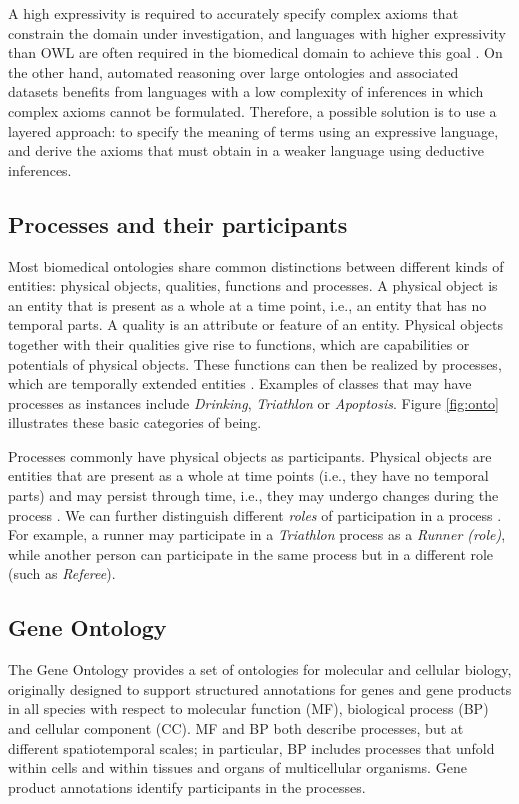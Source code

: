\documentclass[11pt]{article}
\renewcommand{\cite}{\citep}
\begin{document}
A high expressivity is required to accurately specify complex axioms
that constrain the domain under investigation, and languages with
higher expressivity than OWL are often required in the biomedical
domain to achieve this goal \cite{Hoehndorf2009sequences, rnao}. On
the other hand, automated reasoning over large ontologies and
associated datasets benefits from languages with a low complexity of
inferences in which complex axioms cannot be formulated. Therefore, a
possible solution is to use a layered approach: to specify the meaning
of terms using an expressive language, and derive the axioms that
must obtain in a weaker language using deductive inferences.

\subsection{Processes and their participants}
Most biomedical ontologies share common distinctions between different
kinds of entities: physical objects, qualities, functions and
processes. A physical object is an entity that is present as a whole
at a time point, i.e., an entity that has no temporal parts. A quality
is an attribute or feature of an entity. Physical objects together
with their qualities give rise to functions, which are capabilities or
potentials of physical objects. These functions can then be realized
by processes, which are temporally extended entities
\cite{Burek2006}. Examples of classes that may have processes as
instances include {\em Drinking}, {\em Triathlon} or {\em Apoptosis}.
Figure \ref{fig:onto} illustrates these basic categories of being.

Processes commonly have physical objects as participants. Physical
objects are entities that are present as a whole at time points (i.e.,
they have no temporal parts) and may persist through time, i.e., they
may undergo changes during the process \cite{Herre2006, Herre2010}.
We can further distinguish different {\em roles} of participation in a
process \cite{Loebe2007}. For example, a runner may participate in a
{\em Triathlon} process as a {\em Runner (role)}, while another person
can participate in the same process but in a different role (such as
{\em Referee}).


\subsection{Gene Ontology}
The Gene Ontology provides a set of ontologies for molecular and
cellular biology, originally designed to support structured
annotations for genes and gene products in all species with respect to
molecular function (MF), biological process (BP) and cellular
component (CC). MF and BP both describe processes, but at different
spatiotemporal scales; in particular, BP includes processes that
unfold within cells and within tissues and organs of multicellular
organisms. Gene product annotations identify participants in the
processes.
\end{document}
